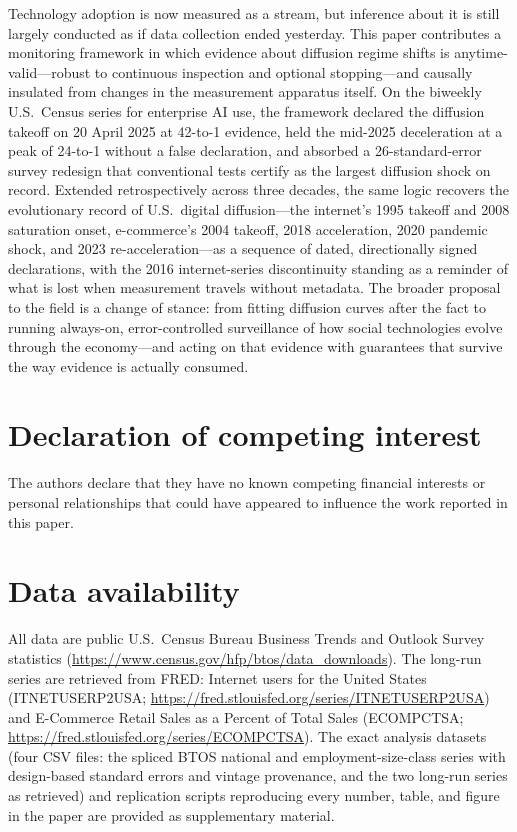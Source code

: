 \documentclass[review,authoryear,12pt]{elsarticle}
\begin{document}
Technology adoption is now measured as a stream, but inference about it is still largely conducted as if data collection ended yesterday. This paper contributes a monitoring framework in which evidence about diffusion regime shifts is anytime-valid---robust to continuous inspection and optional stopping---and causally insulated from changes in the measurement apparatus itself. On the biweekly U.S.\ Census series for enterprise AI use, the framework declared the diffusion takeoff on 20 April 2025 at 42-to-1 evidence, held the mid-2025 deceleration at a peak of 24-to-1 without a false declaration, and absorbed a 26-standard-error survey redesign that conventional tests certify as the largest diffusion shock on record. Extended retrospectively across three decades, the same logic recovers the evolutionary record of U.S.\ digital diffusion---the internet's 1995 takeoff and 2008 saturation onset, e-commerce's 2004 takeoff, 2018 acceleration, 2020 pandemic shock, and 2023 re-acceleration---as a sequence of dated, directionally signed declarations, with the 2016 internet-series discontinuity standing as a reminder of what is lost when measurement travels without metadata. The broader proposal to the field is a change of stance: from fitting diffusion curves after the fact to running always-on, error-controlled surveillance of how social technologies evolve through the economy---and acting on that evidence with guarantees that survive the way evidence is actually consumed.

\section*{Declaration of competing interest}
The authors declare that they have no known competing financial interests or personal relationships that could have appeared to influence the work reported in this paper.

\section*{Data availability}
All data are public U.S.\ Census Bureau Business Trends and Outlook Survey statistics (\url{https://www.census.gov/hfp/btos/data_downloads}). The long-run series are retrieved from FRED: Internet users for the United States (ITNETUSERP2USA; \url{https://fred.stlouisfed.org/series/ITNETUSERP2USA}) and E-Commerce Retail Sales as a Percent of Total Sales (ECOMPCTSA; \url{https://fred.stlouisfed.org/series/ECOMPCTSA}). The exact analysis datasets (four CSV files: the spliced BTOS national and employment-size-class series with design-based standard errors and vintage provenance, and the two long-run series as retrieved) and replication scripts reproducing every number, table, and figure in the paper are provided as supplementary material.
\end{document}
